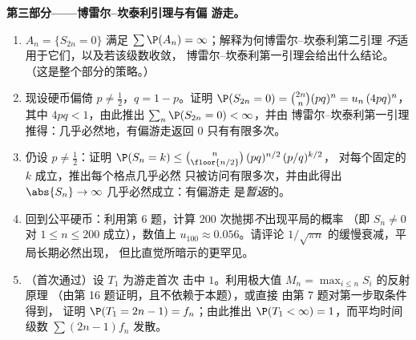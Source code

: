 \begin{problem}
\medskip
\noindent\textbf{第三部分——博雷尔--坎泰利引理与有偏
游走。}
\begin{enumerate}[resume]
  \item {} $A_n = \{S_{2n} = 0\}$ 满足 $\sum\P(A_n)
        = \infty$；解释为何博雷尔--坎泰利第二引理
        \emph{不}适用于它们，以及若该级数收敛，
        博雷尔--坎泰利第一引理会给出什么结论。
        （这是整个部分的策略。）
  \item 现设硬币偏倚 $p \neq \frac12$，$q = 1 -
        p$。证明 $\P(S_{2n} = 0) = \binom{2n}n(pq)^n =
        u_n\,(4pq)^n$，其中 $4pq < 1$，由此推出
        $\sum_n\P(S_{2n} = 0) < \infty$，并由
        博雷尔--坎泰利第一引理推得：几乎必然地，有偏游走返回 $0$
        只有有限多次。
  \item 仍设 $p \neq \frac12$：证明 $\P(S_n = k) \leq
        \binom{n}{\floor{n/2}}\,(pq)^{n/2}\,(p/q)^{k/2}$，
        对每个固定的 $k$ 成立，推出每个格点几乎必然
        只被访问有限多次，并由此得出
        $\abs{S_n} \to \infty$ 几乎必然成立：有偏游走
        是\emph{暂返}的。
  \item 回到公平硬币：利用第 6 题，计算
        $200$ 次抛掷\emph{不}出现平局的概率
        （即 $S_n \neq 0$ 对 $1 \leq n \leq 200$ 成立），数值上
        $u_{100} \approx 0.056$。请评论
        $1/\sqrt{\pi n}$ 的缓慢衰减，平局长期必然出现，
        但比直觉所暗示的更罕见。
  \item （首次通过）设 $T_1$ 为游走首次
        击中 $1$。利用极大值
        $M_n = \max_{i\leq n}S_i$ 的反射原理
        （由第 16 题证明，且不依赖于本题），或直接
        由第 7 题对第一步取条件得到，
        证明 $\P(T_1 = 2n - 1) = f_n$；由此推出 $\P(T_1 <
        \infty) = 1$，而平均时间级数
        $\sum(2n-1)f_n$ 发散。
\end{enumerate}


\end{problem}
